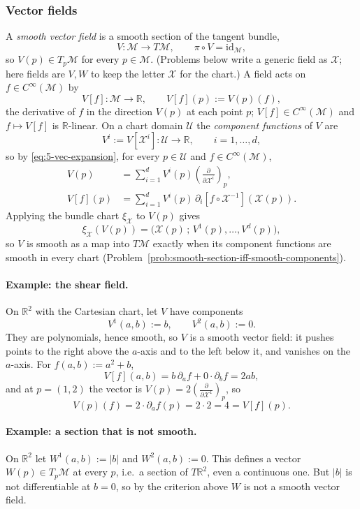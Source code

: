 \documentclass[11pt]{article}
\newcommand{\TpM}{T_p\mathcal M}
\newcommand{\Cinf}{C^\infty(\mathcal M)}
\begin{document}
\subsubsection*{Vector fields}
A \emph{smooth vector field} is a smooth section of the tangent bundle,
\[
V:\mathcal M\to T\mathcal M,\qquad \pi\circ V=\mathrm{id}_{\mathcal M},
\]
so $V(p)\in\TpM$ for every $p\in\mathcal M$. (Problems below write a generic field as $\mathcal X$; here fields are $V,W$ to keep the letter $\mathcal X$ for the chart.) A field acts on $f\in\Cinf$ by
\[
V[f]:\mathcal M\to\mathbb R,\qquad V[f](p):=V(p)(f),
\]
the derivative of $f$ in the direction $V(p)$ at each point $p$; $V[f]\in\Cinf$ and $f\mapsto V[f]$ is $\mathbb R$-linear. On a chart domain $\mathcal U$ the \emph{component functions} of $V$ are
\[
V^i:=V[\mathcal X^i]:\mathcal U\to\mathbb R,\qquad i=1,\dots,d,
\]
so by \eqref{eq:5-vec-expansion}, for every $p\in\mathcal U$ and $f\in\Cinf$,
\begin{align*}
V(p)&=\sum_{i=1}^dV^i(p)\left(\frac{\partial}{\partial\mathcal X^i}\right)_p,\\
V[f](p)&=\sum_{i=1}^dV^i(p)\,\partial_i[f\circ\mathcal X^{-1}](\mathcal X(p)).
\end{align*}
Applying the bundle chart $\xi_{\mathcal X}$ to $V(p)$ gives
\[
\xi_{\mathcal X}(V(p))=\big(\mathcal X(p)\,;\,V^1(p),\dots,V^d(p)\big),
\]
so $V$ is smooth as a map into $T\mathcal M$ exactly when its component functions are smooth in every chart (Problem~\ref{prob:smooth-section-iff-smooth-components}).

\paragraph{Example: the shear field.} On $\mathbb R^2$ with the Cartesian chart, let $V$ have components
\[
V^1(a,b):=b,\qquad V^2(a,b):=0.
\]
They are polynomials, hence smooth, so $V$ is a smooth vector field: it pushes points to the right above the $a$-axis and to the left below it, and vanishes on the $a$-axis. For $f(a,b):=a^2+b$,
\[
V[f](a,b)=b\,\partial_af+0\cdot\partial_bf=2ab,
\]
and at $p=(1,2)$ the vector is $V(p)=2\left(\frac{\partial}{\partial\mathcal X^1}\right)_p$, so
\[
V(p)(f)=2\cdot\partial_af(p)=2\cdot2=4=V[f](p).
\]

\paragraph{Example: a section that is not smooth.} On $\mathbb R^2$ let $W^1(a,b):=|b|$ and $W^2(a,b):=0$. This defines a vector $W(p)\in\TpM$ at every $p$, i.e.\ a section of $T\mathbb R^2$, even a continuous one. But $|b|$ is not differentiable at $b=0$, so by the criterion above $W$ is not a smooth vector field.
\end{document}
